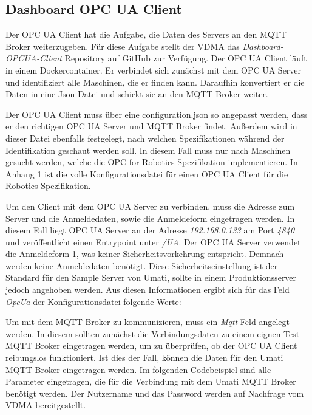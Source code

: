 \documentclass[a4paper, 12pt, oneside, toc=listofnumbered, bibliography=totoc]{scrbook}
\begin{document}
		\subsection{Dashboard OPC UA Client}\label{ch:OPCClient}
		
		Der OPC UA Client hat die Aufgabe, die Daten des Servers an den MQTT Broker weiterzugeben. Für diese Aufgabe stellt der VDMA das \textit{Dashboard-OPCUA-Client} Repository auf GitHub zur Verfügung. Der OPC UA Client läuft in einem Dockercontainer. Er verbindet sich zunächst mit dem OPC UA Server und identifiziert alle Maschinen, die er finden kann. Daraufhin konvertiert er die Daten in eine Json-Datei und schickt sie an den MQTT Broker weiter.
		
		Der OPC UA Client muss über eine configuration.json so angepasst werden, dass er den richtigen OPC UA Server und MQTT Broker findet. Außerdem wird in dieser Datei ebenfalls festgelegt, nach welchen Spezifikationen während der Identifikation geschaut werden soll. In diesem Fall muss nur nach Maschinen gesucht werden, welche die OPC for Robotics Spezifikation implementieren. In Anhang 1 ist die volle Konfigurationsdatei für einen OPC UA Client für die Robotics Spezifikation.
		
		Um den Client mit dem OPC UA Server zu verbinden, muss die Adresse zum Server und die Anmeldedaten, sowie die Anmeldeform eingetragen werden. In diesem Fall liegt OPC UA Server an der Adresse \textit{192.168.0.133} am Port \textit{4840} und veröffentlicht einen Entrypoint unter \textit{/UA}. Der OPC UA Server verwendet die Anmeldeform 1, was keiner Sicherheitsvorkehrung entspricht. Demnach werden keine Anmeldedaten benötigt. Diese Sicherheitseinstellung ist der Standard für den Sample Server von Umati, sollte in einem Produktionsserver jedoch angehoben werden. Aus diesen Informationen ergibt sich für das Feld \textit{OpcUa} der Konfigurationsdatei folgende Werte:
		
		
		
		Um mit dem MQTT Broker zu kommunizieren, muss ein \textit{Mqtt} Feld angelegt werden. In diesem sollten zunächst die Verbindungsdaten zu einem eignen Test MQTT Broker eingetragen werden, um zu überprüfen, ob der OPC UA Client reibungslos funktioniert. Ist dies der Fall, können die Daten für den Umati MQTT Broker eingetragen werden. Im folgenden Codebeispiel sind alle Parameter eingetragen, die für die Verbindung mit dem Umati MQTT Broker benötigt werden. Der Nutzername und das Password werden auf Nachfrage vom VDMA bereitgestellt.
		
\end{document}
